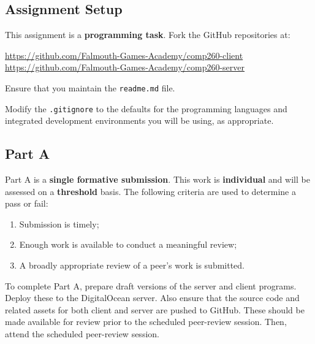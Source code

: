 \documentclass{../../fal_assignment}
\begin{document}
\subsection*{Assignment Setup}

This assignment is a \textbf{programming task}. Fork the GitHub repositories at:

\url{https://github.com/Falmouth-Games-Academy/comp260-client} \\
\url{https://github.com/Falmouth-Games-Academy/comp260-server}

Ensure that you maintain the \texttt{readme.md} file.

Modify the \texttt{.gitignore} to the defaults for the programming languages and integrated development environments you will be using, as appropriate.

\subsection*{Part A}

Part A is a \textbf{single formative submission}. This work is \textbf{individual} and will be assessed on a \textbf{threshold} basis. The following criteria are used to determine a pass or fail:

\begin{enumerate}[label=(\alph*)]
	\item Submission is timely;
	\item Enough work is available to conduct a meaningful review;
	\item A broadly appropriate review of a peer's work is submitted.
\end{enumerate}

To complete Part A, prepare draft versions of the server and client programs. Deploy these to the DigitalOcean server. Also ensure that the source code and related assets for both client and server are pushed to GitHub. These should be made available for review prior to the scheduled peer-review session. Then, attend the scheduled peer-review session.

\end{document}
